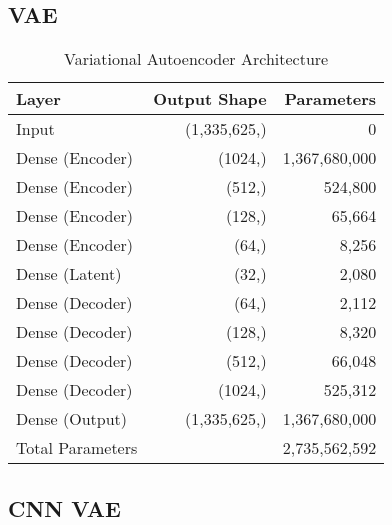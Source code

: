 \subsection{VAE}
\label{app:a-vae}

\begin{table}[h]
    \centering
    \begin{tabular}{lrr}
        \toprule
        Layer & Output Shape & Parameters \\
        \midrule
        Input & (1,335,625,) & 0 \\
        Dense (Encoder) & (1024,) & 1,367,680,000 \\
        Dense (Encoder) & (512,) & 524,800 \\
        Dense (Encoder) & (128,) & 65,664 \\
        Dense (Encoder) & (64,) & 8,256 \\
        Dense (Latent) & (32,) & 2,080 \\
        Dense (Decoder) & (64,) & 2,112 \\
        Dense (Decoder) & (128,) & 8,320 \\
        Dense (Decoder) & (512,) & 66,048 \\
        Dense (Decoder) & (1024,) & 525,312 \\
        Dense (Output) & (1,335,625,) & 1,367,680,000 \\
        \midrule
        Total Parameters & & 2,735,562,592 \\
        \bottomrule
    \end{tabular}
    \caption{Variational Autoencoder Architecture}
    \label{tab:a-vae}
\end{table}

\subsection{CNN VAE}
\label{app:a-cvae}


